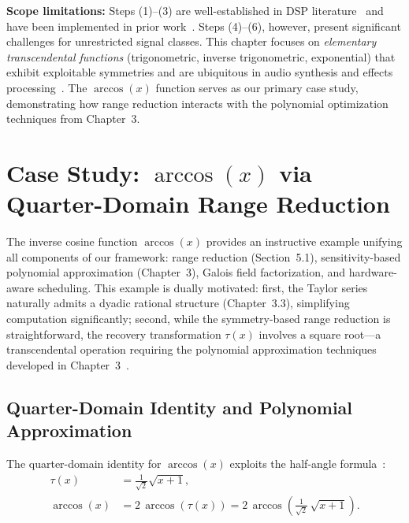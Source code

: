 \noindent\textbf{Scope limitations:} Steps (1)–(3) are well-established in DSP literature~\cite{OppenheimSchafer2010} and have been implemented in prior work~\cite{Das2017,Syfala2024}. Steps (4)–(6), however, present significant challenges for unrestricted signal classes. This chapter focuses on \emph{elementary transcendental functions} (trigonometric, inverse trigonometric, exponential) that exhibit exploitable symmetries and are ubiquitous in audio synthesis and effects processing~\cite{Syfala2024}. The $\arccos(x)$ function serves as our primary case study, demonstrating how range reduction interacts with the polynomial optimization techniques from Chapter~3.

\section{Case Study: \texorpdfstring{$\arccos(x)$}{arccos(x)} via Quarter-Domain Range Reduction}
\label{sec:arccos_impl}

The inverse cosine function $\arccos(x)$ provides an instructive example unifying all components of our framework: range reduction (Section~5.1), sensitivity-based polynomial approximation (Chapter~3), Galois field factorization, and hardware-aware scheduling. This example is dually motivated: first, the Taylor series naturally admits a dyadic rational structure (Chapter~3.3), simplifying computation significantly; second, while the symmetry-based range reduction is straightforward, the recovery transformation $\tau(x)$ involves a square root—a transcendental operation requiring the polynomial approximation techniques developed in Chapter~3~\cite{Muller2006}.

\subsection{Quarter-Domain Identity and Polynomial Approximation}

The quarter-domain identity for $\arccos(x)$ exploits the half-angle formula~\cite{NIST:DLMF}:
\begin{align}
\tau(x) &= \frac{1}{\sqrt{2}}\sqrt{x + 1}, \\
\arccos(x) &= 2 \, \arccos(\tau(x)) = 2 \, \arccos\!\left(\frac{1}{\sqrt{2}} \, \sqrt{x+1}\right).
\end{align}

